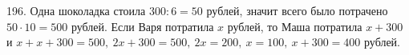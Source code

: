 196. Одна шоколадка стоила $300:6=50$ рублей, значит всего было потрачено $50\cdot10=500$ рублей. Если Варя потратила $x$ рублей, то Маша потратила $x+300$ и $x+x+300=500,\ 2x+300=500,\ 2x=200,\ x=100,\ x+300=400$ рублей.\\
